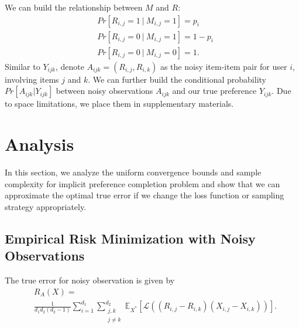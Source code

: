\documentclass[conference]{IEEEtran}
\numberwithin{equation}{section}
\newtheorem{sampling strategy}{Sampling Strategy}
\begin{document}
We can build the relationship between $M$ and $R$:
\begin{equation}
\begin{aligned}
    & Pr[R_{i,j} = 1 ~|~ M_{i,j} = 1] = p_i\\
    & Pr[R_{i,j} = 0 ~|~ M_{i,j} = 1] = 1 - p_i\\
    & Pr[R_{i,j} = 0 ~|~ M_{i,j} = 0] = 1. \nonumber
\end{aligned}
\end{equation}
Similar to $Y_{ijk}$, denote $A_{ijk} = (R_{i,j}, R_{i,k})$ as the noisy item-item pair for user $i$, involving items $j$ and $k$. We can further build the conditional probability $Pr[A_{ijk} | Y_{ijk}] $ between noisy observations $A_{ijk}$ and our true preference $Y_{ijk}$. Due to  space limitations, we place them in supplementary materials.






\section{Analysis}
\label{sec:analysis}

In this section, we analyze the uniform convergence bounds and sample complexity for implicit preference completion problem and show that we can approximate the optimal true error if we change the loss function or sampling strategy appropriately.

\subsection{Empirical Risk Minimization with Noisy Observations}

The true error for noisy observation is given by
\begin{equation}
    \begin{aligned}
    & R_A(X) = \\
    & \frac{1}{d_1 d_2(d_2-1)} \sum_{i=1}^{d_1}\sum_{\substack{j,k\\ j \neq k} }^{d_2} \mathbb{E}_{X^*} [ \mathcal{L}( (R_{i,j} - R_{i,k})(X_{i,j} - X_{i,k}) ) ].   \nonumber
    \end{aligned}
\end{equation} 
\end{document}
